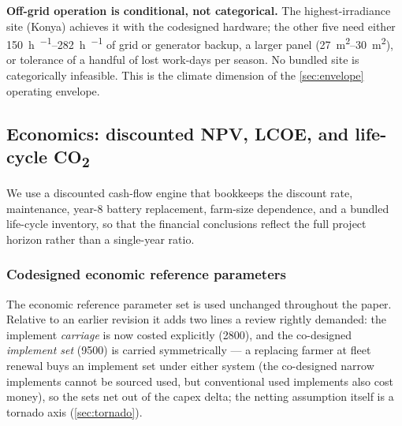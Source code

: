 \documentclass[11pt,a4paper]{article}
\begin{document}
\textbf{Off-grid operation is conditional, not categorical.} The highest-irradiance site (Konya) achieves it with the codesigned hardware; the other five need either \SIrange{150}{282}{\hour\per\year} of grid or generator backup, a larger panel (\SIrange{27}{30}{\meter\squared}), or tolerance of a handful of lost work-days per season. No bundled site is categorically infeasible. This is the climate dimension of the \cref{sec:envelope} operating envelope.

\subsection{Economics: discounted NPV, LCOE, and life-cycle CO\textsubscript{2}}\label{sec:economics}

We use a discounted cash-flow engine that bookkeeps the discount rate, maintenance, year-8 battery replacement, farm-size dependence, and a bundled life-cycle inventory, so that the financial conclusions reflect the full project horizon rather than a single-year ratio.

\subsubsection{Codesigned economic reference parameters}\label{sec:econ-params}

The economic reference parameter set is used unchanged throughout the paper. Relative to an earlier revision it adds two lines a review rightly demanded: the implement \emph{carriage} is now costed explicitly (\SI{2800}{\EUR}), and the co-designed \emph{implement set} (\SI{9500}{\EUR}) is carried symmetrically --- a replacing farmer at fleet renewal buys an implement set under either system (the co-designed narrow implements cannot be sourced used, but conventional used implements also cost money), so the sets net out of the capex delta; the netting assumption itself is a tornado axis (\cref{sec:tornado}).
\end{document}
